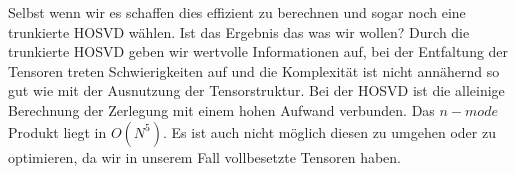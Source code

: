 Selbst wenn wir es schaffen dies effizient zu berechnen und sogar noch eine trunkierte HOSVD wählen. Ist das Ergebnis das was wir wollen? Durch die trunkierte HOSVD geben wir wertvolle Informationen auf, bei der Entfaltung der Tensoren treten Schwierigkeiten auf und die Komplexität ist nicht annähernd so gut wie mit der Ausnutzung der Tensorstruktur.
Bei der HOSVD ist die alleinige Berechnung der Zerlegung mit einem hohen Aufwand verbunden. Das $n-mode$ Produkt liegt in $O(N^5)$. Es ist auch nicht möglich diesen zu umgehen oder zu optimieren, da wir in unserem Fall vollbesetzte Tensoren haben. 

